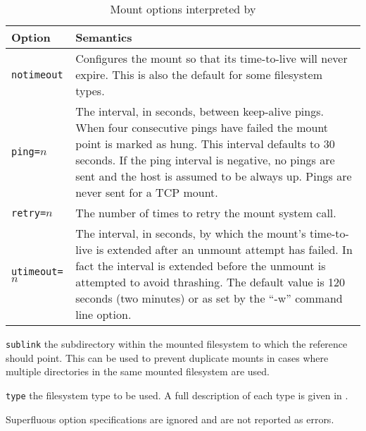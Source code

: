 \begin{list}{}
\begin{table}[htb]
\centering
\begin{tabular}{lp{4in}}
Option		& Semantics \\\hline
\tt notimeout	& Configures the mount so that its time-to-live will
		  never expire.  This is also the default for some
		  filesystem types. \\
%
\tt ping=$n$	& The interval, in seconds, between keep-alive pings.  When four
		  consecutive pings have failed the mount point is
		  marked as hung.  This interval defaults to 30 seconds.
		  If the ping interval is negative, no pings are sent and
		  the host is assumed to be always up.  Pings are never sent
		  for a TCP mount.  \\

\tt retry=$n$	& The number of times to retry the mount system call. \\
\tt utimeout=$n$& The interval, in seconds, by which the mount's
		  time-to-live\label{opt:utimeout}
		  is extended after an unmount attempt has failed.
		  In fact the interval is extended before the unmount
		  is attempted to avoid thrashing.  The default value
                  is 120 seconds (two minutes) or as set by the ``-w''
                  command line option. \\
\end{tabular}
\caption{Mount options interpreted by \amd\label{table:pseudo-mount opts}}
\end{table}

\item[\tt sublink\hfill]
the subdirectory within the mounted filesystem to which the reference
should point.
This can be used to prevent duplicate mounts in cases where multiple
directories in the same mounted filesystem are used.

\item[\tt type\hfill]
the filesystem type to be used.  A full description of each
type is given in .

\end{list}

Superfluous option specifications are ignored and are not reported
as errors.
